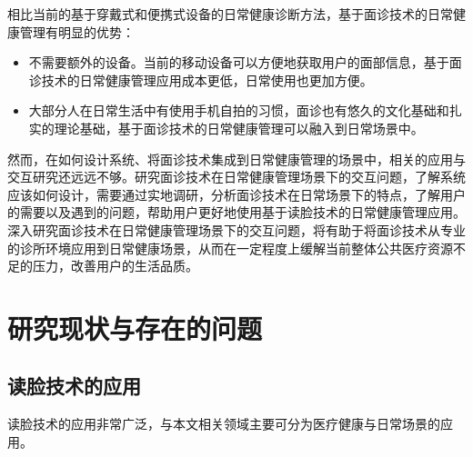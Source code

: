 

相比当前的基于穿戴式和便携式设备的日常健康诊断方法，基于面诊技术的日常健康管理有明显的优势：

\begin{itemize}
    \item 不需要额外的设备。当前的移动设备可以方便地获取用户的面部信息，基于面诊技术的日常健康管理应用成本更低，日常使用也更加方便。
    
    \item 大部分人在日常生活中有使用手机自拍的习惯，面诊也有悠久的文化基础和扎实的理论基础，基于面诊技术的日常健康管理可以融入到日常场景中。
\end{itemize}

然而，在如何设计系统、将面诊技术集成到日常健康管理的场景中，相关的应用与交互研究还远远不够。研究面诊技术在日常健康管理场景下的交互问题，了解系统应该如何设计，需要通过实地调研，分析面诊技术在日常场景下的特点，了解用户的需要以及遇到的问题，帮助用户更好地使用基于读脸技术的日常健康管理应用。
深入研究面诊技术在日常健康管理场景下的交互问题，将有助于将面诊技术从专业的诊所环境应用到日常健康场景，从而在一定程度上缓解当前整体公共医疗资源不足的压力，改善用户的生活品质。



\section{研究现状与存在的问题}


\subsection{读脸技术的应用}
读脸技术的应用非常广泛，与本文相关领域主要可分为医疗健康与日常场景的应用。

